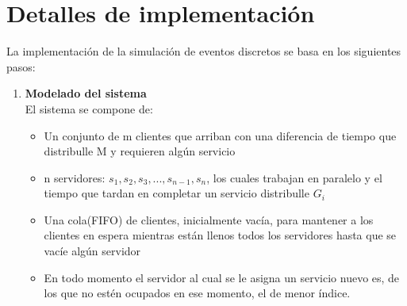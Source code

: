 \documentclass[article]{amsart}
\begin{document}
\section{Detalles de implementaci\'on}
La implementación de la simulación de eventos discretos se basa en los siguientes pasos:
\begin{enumerate}
\item \textbf{Modelado del sistema}\\
El sistema se compone de:
\begin{itemize}
\item Un conjunto de m clientes que arriban con una diferencia de tiempo que distribulle M y requieren alg\'un servicio\\
\item n servidores: $s_{1}, s_{2}, s_{3}, ..., s_{n-1}, s_{n}$, los cuales trabajan en paralelo y el tiempo que tardan en completar un servicio distribulle $G_{i}$\\
\item Una cola(FIFO) de clientes, inicialmente vac\'ia, para mantener a los clientes en espera mientras est\'an llenos todos los servidores hasta que se vac\'ie alg\'un servidor\\
\item En todo momento el servidor al cual se le asigna un servicio nuevo es, de los que no est\'en ocupados en ese momento, el de menor \'indice.\\
\end{itemize}


\end{enumerate}
\end{document}
